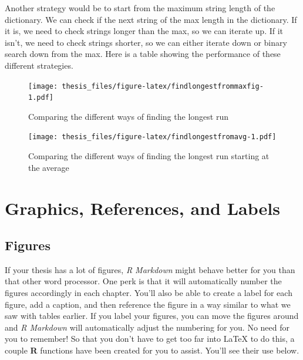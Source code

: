 \documentclass[12pt,twoside]{reedthesis}
\begin{document}
Another strategy would be to start from the maximum string length of the dictionary. We can check if the next string of the max length in the dictionary. If it is, we need to check strings longer than the max, so we can iterate up. If it isn't, we need to check strings shorter, so we can either iterate down or binary search down from the max. Here is a table showing the performance of these different strategies.
\begin{figure}
\centering
\texttt{[image: thesis\_files/figure-latex/findlongestfrommaxfig-1.pdf]}
\caption{\label{fig:findlongestfrommaxfig}Comparing the different ways of finding the longest run}
\end{figure}
\begin{figure}
\centering
\texttt{[image: thesis\_files/figure-latex/findlongestfromavg-1.pdf]}
\caption{\label{fig:findlongestfromavg}Comparing the different ways of finding the longest run starting at the average}
\end{figure}
\hypertarget{ref-labels}{%
\chapter{Graphics, References, and Labels}\label{ref-labels}}

\hypertarget{figures}{%
\section{Figures}\label{figures}}

If your thesis has a lot of figures, \emph{R Markdown} might behave better for you than that other word processor. One perk is that it will automatically number the figures accordingly in each chapter. You'll also be able to create a label for each figure, add a caption, and then reference the figure in a way similar to what we saw with tables earlier. If you label your figures, you can move the figures around and \emph{R Markdown} will automatically adjust the numbering for you. No need for you to remember! So that you don't have to get too far into LaTeX to do this, a couple \textbf{R} functions have been created for you to assist. You'll see their use below.
\end{document}
